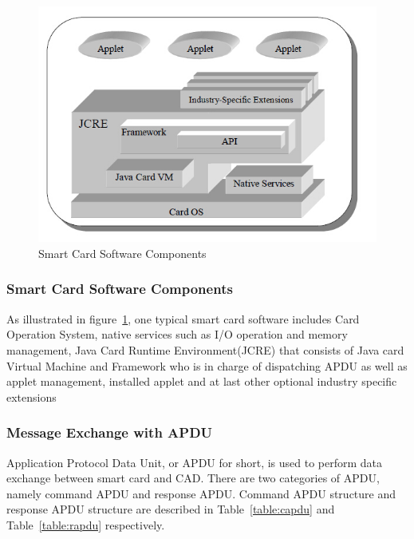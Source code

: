 \documentclass[]{llncs}
\begin{document}
\begin{figure}[!htbp]
	\centering
	\includegraphics[width=1.2\textwidth]{scc.jpg}
		\caption[ ]{Smart Card Software Components\cite{jcadg}}
	\label{fig:scc}
\end{figure}

\subsubsection{Smart Card Software Components}
As illustrated in figure~\ref{fig:scc}, one typical smart card software includes Card Operation System, native services such as I/O operation and memory management, Java Card Runtime Environment(JCRE) that consists of Java card  Virtual Machine and Framework who is in charge of dispatching APDU as well as applet management, installed applet and at last other optional industry specific extensions\cite{jcadg}

\subsubsection{Message Exchange with APDU}
Application Protocol Data Unit, or APDU for short, is used  to perform data exchange between smart card and CAD. There are two categories of APDU, namely command APDU and response APDU. Command APDU structure and response APDU structure are described in Table~\ref{table:capdu} and Table~\ref{table:rapdu} respectively\cite{handbuch}. 
\end{document}
